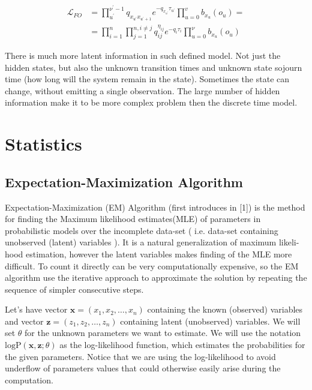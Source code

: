 \documentclass[thesis=M,english]{FITthesis}[2012/10/20]
\begin{document}
\begin{equation}\label{eq:HMCL1}
\begin{aligned}  
 \mathcal{L}_{FO} &= \prod_{u^{'}}^{\nu^{'}-1} q_{x_{u^{'}} x_{u^{'}+1}} e^{ - q_{x_{u^{'}}} \tau_{u^{'}} } 
    \prod_{u=0}^v b_{ x_u }(o_u) = \\
    &= \prod_{i=1}^{n} \prod_{j=1}^{n, i \neq j} q_{ij}^{\eta_{ij} } e^{ - q_i \tau_i } \prod_{u=0}^\nu b_{x_u}(o_u)
\end{aligned}
\end{equation}

There is much more latent information in such defined model. Not just the hidden states, but also the unknown transition times and unknown state sojourn time (how long will the system remain in the state).
Sometimes the state can change, without emitting a single observation. The large number of hidden information make it to be more complex problem then the discrete time model.

\chapter{Statistics}


\section{Expectation-Maximization Algorithm}\label{ch:EM}



Expectation-Maximization (EM) Algorithm (first introduces in [1]) is the method for finding the Maximum likelihood estimates(MLE) of parameters in probabilistic models over the incomplete data-set ( i.e. data-set containing unobserved (latent) variables ). It is a natural generalization of maximum likeli-
hood estimation, however the latent variables makes finding of the MLE more difficult. To count it directly can be very computationally expensive, so the EM algorithm use the iterative approach to approximate the solution by repeating the sequence of simpler consecutive steps.

Let's have vector $\mathbf{x} = (x_{1},x_{2},\dotsc,x_{n})$ containing the known (observed) variables and vector $\mathbf{z} = (z_{1},z_{2},\dotsc,z_{n})$ containing latent (unobserved) variables. We will set $\theta$ for the unknown parameters we want to estimate. We will use the notation $\mathrm{logP}(\mathbf{x},\mathbf{z};\theta)$ as the log-likelihood function, which estimates the probabilities for the given parameters. Notice that we are using the log-likelihood to avoid underflow of parameters values that could otherwise easily arise during the computation.  
\end{document}
